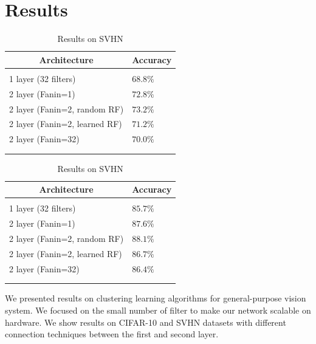 \documentclass{article} %
\begin{document}
\section{Results}
\label{sec-results}

\begin {table}
\parbox{.5\linewidth}{
\caption{Results on CIFAR-10}
\label{resuts-cifar10}
\begin{center}
\begin{tabular}{ll}
\multicolumn{1}{c}{\bf Architecture}  &\multicolumn{1}{c}{\bf Accuracy}
\\ \hline \\
1 layer (32 filters)                            & $68.8\%$\\
2 layer (Fanin=1)                            &$72.8\%$ \\
2 layer (Fanin=2, random RF)            &$73.2\%$ \\
2 layer (Fanin=2, learned RF)            &$71.2\%$\\
2 layer (Fanin=32)                          &$70.0\%$\\
\\ \hline \\
\end{tabular}
\end{center}
}
\parbox{.5\linewidth}{
\caption{Results on SVHN}
\label{resuts-svhn}
\begin{center}
\begin{tabular}{ll}
\multicolumn{1}{c}{\bf Architecture}  &\multicolumn{1}{c}{\bf Accuracy}
\\ \hline \\
1 layer (32 filters)                          & $85.7\%$\\
2 layer (Fanin=1)                           &$87.6\%$ \\
2 layer (Fanin=2, random RF)           &$88.1\%$ \\
2 layer (Fanin=2, learned RF)           &$86.7\%$\\
2 layer (Fanin=32)                        &$86.4\%$\\
\\ \hline \\
\end{tabular}
\end{center}
}
\end{table}



We presented results on clustering learning algorithms for general-purpose vision system. We focused on the small number of filter to make our network scalable on hardware. We show results on CIFAR-10 and SVHN datasets with different connection techniques between the first and second layer. 
\end{document}
